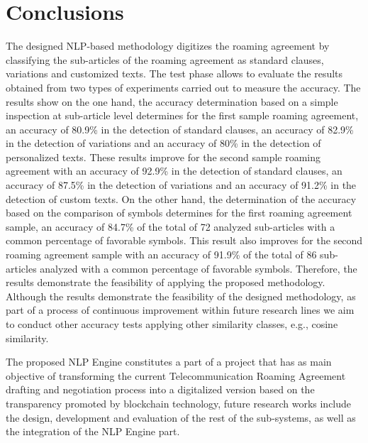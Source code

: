 \documentclass[conference]{style/IEEEtran}
\begin{document}
\section{Conclusions}
The designed NLP-based methodology digitizes the roaming agreement by classifying the sub-articles of the roaming agreement as standard clauses, variations and customized texts. The test phase allows to evaluate the results obtained from two types of experiments carried out to measure the accuracy. The results show on the one hand, the accuracy  determination  based  on  a  simple  inspection  at sub-article level determines for the first sample roaming agreement, an accuracy of 80.9\% in the detection of standard clauses, an accuracy of 82.9\% in the detection of variations and an accuracy of 80\% in the detection of personalized texts. These results improve for the second sample roaming agreement with an accuracy of 92.9\% in the detection of standard clauses, an accuracy of 87.5\% in the detection of variations and an accuracy of 91.2\% in the detection of custom texts. On the other hand, the determination of the accuracy based on the comparison of symbols determines for the first roaming agreement sample, an accuracy of 84.7\% of the total of 72 analyzed sub-articles with a common percentage of favorable symbols. This result also improves for the second roaming agreement sample with an accuracy of 91.9\% of the total of 86 sub-articles analyzed with a common percentage of favorable symbols. Therefore, the results demonstrate the feasibility of applying the proposed methodology. Although the results demonstrate the feasibility of the designed methodology, as part of a process of continuous improvement within future research lines we aim to conduct other accuracy tests applying other similarity classes, e.g., cosine similarity.

The proposed NLP Engine constitutes a part of a project that has as main objective of transforming the current Telecommunication Roaming Agreement drafting and negotiation process into a digitalized version based on the transparency promoted by blockchain technology, future research works include the design, development and evaluation of the rest of the sub-systems, as well as the integration of the NLP Engine part.

\printbibliography

\vspace{12pt}
\end{document}
